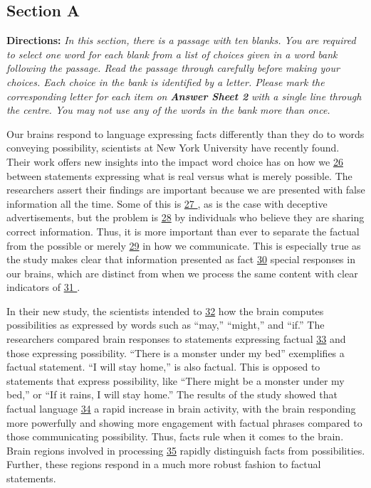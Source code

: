 \documentclass[UTF8,11pt]{ctexart}
\begin{document}
\subsection*{\textbf{Section A}}


\textbf{Directions:} \textit{In this section, there is a passage with ten blanks. You are required to select one word for each blank} \textit{from a list of choices given in a word bank following the passage. Read the passage through carefully before} \textit{making your choices. Each choice in the bank is identified by a letter. Please mark the corresponding letter for} \textit{each item on }\textbf{\textit{Answer Sheet 2}}\textit{ with a single line through the centre. You may not use any of the words in the bank} \textit{more than once.}


Our brains respond to language expressing facts differently than they do to words conveying possibility, scientists at New York University have recently found. Their work offers new insights into the impact word choice has on how we \uline{26} between statements expressing what is real versus what is merely possible. The researchers assert their findings are important because we are presented with false information all the time. Some of this is \uline{27 }, as is the case with deceptive advertisements, but the problem is \uline{28} by individuals who believe they are sharing correct information. Thus, it is more important than ever to separate the factual from the possible or merely \uline{29} in how we communicate. This is especially true as the study makes clear that information presented as fact \uline{30} special responses in our brains, which are distinct from when we process the same content with clear indicators of \uline{31 }.


In their new study, the scientists intended to \uline{32} how the brain computes possibilities as expressed by words such as “may,” “might,” and “if.” The researchers compared brain responses to statements expressing factual \uline{33} and those expressing possibility. “There is a monster under my bed” exemplifies a factual statement. “I will stay home,” is also factual. This is opposed to statements that express possibility, like “There might be a monster under my bed,” or “If it rains, I will stay home.” The results of the study showed that factual language \uline{34} a rapid increase in brain activity, with the brain responding more powerfully and showing more engagement with factual phrases compared to those communicating possibility. Thus, facts rule when it comes to the brain. Brain regions involved in processing \uline{35} rapidly distinguish facts from possibilities. Further, these regions respond in a much more robust fashion to factual statements.
\end{document}
